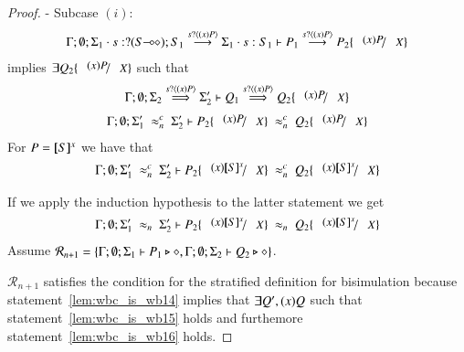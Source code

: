 \begin{proof}
	\noi - Subcase $(i)$:
%
	\begin{eqnarray}
		\Gamma; \emptyset; \Sigma_1 \cat s: \btinp{\lhot{S}} S_1 \by{\bactinp{s}{\abs{x} P}} \Sigma_1 \cat s: S_1 \proves P_1 \by{\bactinp{s}{\abs{x} P}} P_2 \subst{(x) P}{X}
		\label{lem:wbc_is_wb14}
	\end{eqnarray}
%
	implies
	$\exists Q_2 \subst{(x) P}{X}$ such that
	\begin{eqnarray}
		\Gamma; \emptyset; \Sigma_2 \By{\bactinp{s}{\abs{x} P}} \Sigma_2' \proves Q_1 \By{\bactinp{s}{\abs{x} P}} Q_2 \subst{(x) P}{X}  \label{lem:wbc_is_wb15}
	\end{eqnarray}
%
	\begin{eqnarray*}
		\Gamma; \emptyset; \Sigma_1'\ \wbc_{n}\ \Sigma_2' \proves P_2 \subst{(x) P}{X}\ \wbc_{n}\ Q_2 \subst{(x) P}{X}
	\end{eqnarray*}
%
	\noi For $P = [\!\![S]\!\!]^x$ we have that 
%
	\begin{eqnarray*}
		\Gamma; \emptyset; \Sigma_1'\ \wbc_{n}\ \Sigma_2' \proves P_2 \subst{(x) \map{S}^x}{X}\ \wbc_{n}\ Q_2 \subst{(x) \map{S}^x}{X}
	\end{eqnarray*}
%

	\noi If we apply the induction hypothesis to the latter statement we get
%
	\begin{eqnarray}
		\Gamma; \emptyset; \Sigma_1'\ \wb_{n}\ \Sigma_2' \proves P_2 \subst{(x) \map{S}^x}{X}\ \wb_{n}\ Q_2 \subst{(x) \map{S}^x}{X}
		\label{lem:wbc_is_wb16}
	\end{eqnarray}
%
	\noi Assume $\mathcal{R}_{n+1} = \{\Gamma; \emptyset; \Sigma_1 \vdash P_1 \triangleright \diamond, \Gamma; \emptyset; \Sigma_2 \vdash Q_2 \triangleright \diamond\}$.

	\noi $\mathcal{R}_{n+1}$ satisfies the condition for the stratified definition for bisimulation
	because statement~\ref{lem:wbc_is_wb14} implies that
	$\exists Q', (x)Q$ such that
	statement~\ref{lem:wbc_is_wb15} holds and furthemore statement~\ref{lem:wbc_is_wb16} holds.


\end{proof}
